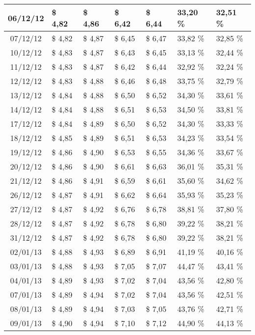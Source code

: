\begin{center}
\begin{longtable}{|c|p{1.5cm}|p{1.5cm}|p{1.5cm}|p{1.5cm}|p{1.5cm}|p{1.5cm}|}
06/12/12 & \$ 4,82 & \$ 4,86 & \$ 6,42 & \$ 6,44 & 33,20 \% & 32,51 \% \\ \hline
07/12/12 & \$ 4,82 & \$ 4,87 & \$ 6,45 & \$ 6,47 & 33,82 \% & 32,85 \% \\ \hline
10/12/12 & \$ 4,83 & \$ 4,87 & \$ 6,43 & \$ 6,45 & 33,13 \% & 32,44 \% \\ \hline
11/12/12 & \$ 4,83 & \$ 4,87 & \$ 6,42 & \$ 6,44 & 32,92 \% & 32,24 \% \\ \hline
12/12/12 & \$ 4,83 & \$ 4,88 & \$ 6,46 & \$ 6,48 & 33,75 \% & 32,79 \% \\ \hline
13/12/12 & \$ 4,84 & \$ 4,88 & \$ 6,50 & \$ 6,52 & 34,30 \% & 33,61 \% \\ \hline
14/12/12 & \$ 4,84 & \$ 4,88 & \$ 6,51 & \$ 6,53 & 34,50 \% & 33,81 \% \\ \hline
17/12/12 & \$ 4,84 & \$ 4,89 & \$ 6,50 & \$ 6,52 & 34,30 \% & 33,33 \% \\ \hline
18/12/12 & \$ 4,85 & \$ 4,89 & \$ 6,51 & \$ 6,53 & 34,23 \% & 33,54 \% \\ \hline
19/12/12 & \$ 4,86 & \$ 4,90 & \$ 6,53 & \$ 6,55 & 34,36 \% & 33,67 \% \\ \hline
20/12/12 & \$ 4,86 & \$ 4,90 & \$ 6,61 & \$ 6,63 & 36,01 \% & 35,31 \% \\ \hline
21/12/12 & \$ 4,86 & \$ 4,91 & \$ 6,59 & \$ 6,61 & 35,60 \% & 34,62 \% \\ \hline
26/12/12 & \$ 4,87 & \$ 4,91 & \$ 6,62 & \$ 6,64 & 35,93 \% & 35,23 \% \\ \hline
27/12/12 & \$ 4,87 & \$ 4,92 & \$ 6,76 & \$ 6,78 & 38,81 \% & 37,80 \% \\ \hline
28/12/12 & \$ 4,87 & \$ 4,92 & \$ 6,78 & \$ 6,80 & 39,22 \% & 38,21 \% \\ \hline
31/12/12 & \$ 4,87 & \$ 4,92 & \$ 6,78 & \$ 6,80 & 39,22 \% & 38,21 \% \\ \hline
02/01/13 & \$ 4,88 & \$ 4,93 & \$ 6,89 & \$ 6,91 & 41,19 \% & 40,16 \% \\ \hline
03/01/13 & \$ 4,88 & \$ 4,93 & \$ 7,05 & \$ 7,07 & 44,47 \% & 43,41 \% \\ \hline
04/01/13 & \$ 4,89 & \$ 4,93 & \$ 7,02 & \$ 7,04 & 43,56 \% & 42,80 \% \\ \hline
07/01/13 & \$ 4,89 & \$ 4,94 & \$ 7,02 & \$ 7,04 & 43,56 \% & 42,51 \% \\ \hline
08/01/13 & \$ 4,89 & \$ 4,94 & \$ 7,03 & \$ 7,05 & 43,76 \% & 42,71 \% \\ \hline
09/01/13 & \$ 4,90 & \$ 4,94 & \$ 7,10 & \$ 7,12 & 44,90 \% & 44,13 \% \\ \hline

\end{longtable}
\end{center}

